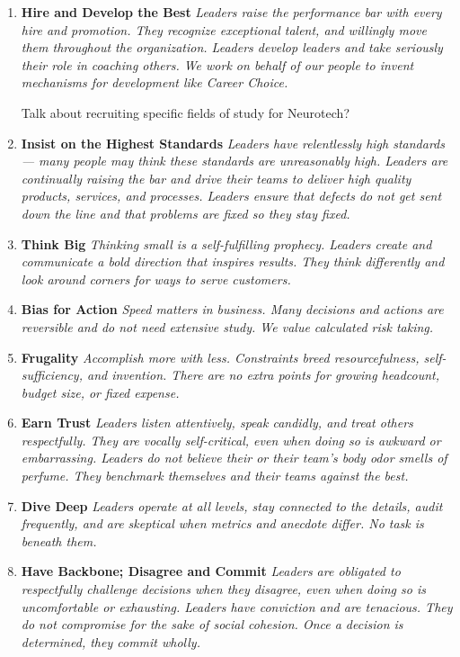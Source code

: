 \documentclass{article}
\begin{document}
\begin{enumerate}
\item \textbf{Hire and Develop the Best} \textit{Leaders raise the performance bar with every hire and promotion. They recognize exceptional talent, and willingly move them throughout the organization. Leaders develop leaders and take seriously their role in coaching others. We work on behalf of our people to invent mechanisms for development like Career Choice.}

Talk about recruiting specific fields of study for Neurotech?

\item \textbf{Insist on the Highest Standards} \textit{Leaders have relentlessly high standards — many people may think these standards are unreasonably high. Leaders are continually raising the bar and drive their teams to deliver high quality products, services, and processes. Leaders ensure that defects do not get sent down the line and that problems are fixed so they stay fixed.}

\item \textbf{Think Big} \textit{Thinking small is a self-fulfilling prophecy. Leaders create and communicate a bold direction that inspires results. They think differently and look around corners for ways to serve customers.}

\item \textbf{Bias for Action} \textit{Speed matters in business. Many decisions and actions are reversible and do not need extensive study. We value calculated risk taking.}

\item \textbf{Frugality} \textit{Accomplish more with less. Constraints breed resourcefulness, self-sufficiency, and invention. There are no extra points for growing headcount, budget size, or fixed expense.}

\item \textbf{Earn Trust} \textit{Leaders listen attentively, speak candidly, and treat others respectfully. They are vocally self-critical, even when doing so is awkward or embarrassing. Leaders do not believe their or their team’s body odor smells of perfume. They benchmark themselves and their teams against the best.}

\item \textbf{Dive Deep} \textit{Leaders operate at all levels, stay connected to the details, audit frequently, and are skeptical when metrics and anecdote differ. No task is beneath them.}

\item \textbf{Have Backbone; Disagree and Commit}\textit{ Leaders are obligated to respectfully challenge decisions when they disagree, even when doing so is uncomfortable or exhausting. Leaders have conviction and are tenacious. They do not compromise for the sake of social cohesion. Once a decision is determined, they commit wholly.}


\end{enumerate}
\end{document}

